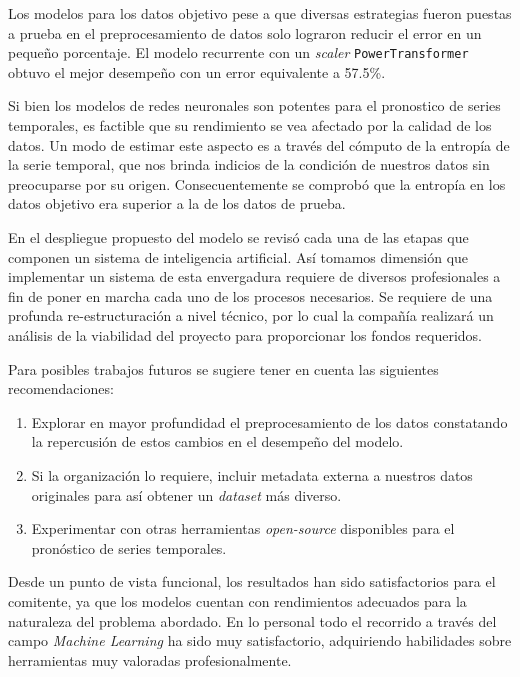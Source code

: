 \documentclass[a4paper,12pt]{article}
\begin{document}
		Los modelos para los datos objetivo pese a que diversas estrategias fueron puestas a prueba en el preprocesamiento de datos solo lograron reducir el error en un pequeño porcentaje. El modelo recurrente con un \textit{scaler} \texttt{PowerTransformer} obtuvo el mejor desempeño con un error equivalente a 57.5\%.
				
		Si bien los modelos de redes neuronales son potentes para el pronostico de series temporales, es factible que su rendimiento se vea afectado por la calidad de los datos. Un modo de estimar este aspecto es a través del cómputo de la entropía de la serie temporal, que nos brinda indicios de la condición de nuestros datos sin preocuparse por su origen. Consecuentemente se comprobó que la entropía en los datos objetivo era superior a la de los datos de prueba.
				
		En el despliegue propuesto del modelo se revisó cada una de las etapas que componen un sistema de inteligencia artificial. Así tomamos dimensión que implementar un sistema de esta envergadura requiere de diversos profesionales a fin de poner en marcha cada uno de los procesos necesarios. Se requiere de una profunda re-estructuración a nivel técnico, por lo cual la compañía realizará un análisis de la viabilidad del proyecto para proporcionar los fondos requeridos.
				
		Para posibles trabajos futuros se sugiere tener en cuenta las siguientes recomendaciones:
				
		\begin{enumerate}[noitemsep, topsep=2pt]
			\item Explorar en mayor profundidad el preprocesamiento de los datos constatando la repercusión de estos cambios en el desempeño del modelo.
			\item Si la organización lo requiere, incluir metadata externa a nuestros datos originales para así obtener un \textit{dataset} más diverso.
			\item Experimentar con otras herramientas \textit{open-source} disponibles para el pronóstico de series temporales.
		\end{enumerate}
				
		Desde un punto de vista funcional, los resultados han sido satisfactorios para el comitente, ya que los modelos cuentan con rendimientos adecuados para la naturaleza del problema abordado. En lo personal todo el recorrido a través del campo \textit{Machine Learning} ha sido muy satisfactorio, adquiriendo habilidades sobre herramientas muy valoradas profesionalmente.
				
		\clearpage
				
		{}
		
				
\end{document}
